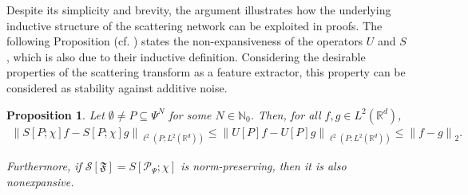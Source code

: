\documentclass[11pt]{amsart}
\newcommand{\R}{{\mathbb{R}}}
\newcommand{\N}{\mathbb{N}}
\newcommand{\s}{\mathcal{S}}
\newcommand{\norm}[1]{\ensuremath{\left\lVert\text{}#1\text{}\right\rVert}}
\newtheorem{proposition}[theorem]{Proposition}
\newenvironment{proof sketch} {\textit{Proof sketch.}}{}
\begin{document}
  Despite its simplicity and brevity, the argument illustrates how the underlying inductive structure of the scattering network can be exploited in proofs. The following Proposition (cf. \cite[Proposition 2.5]{mallat2012group}) states the non-expansiveness of the operators $U$ and $S$, which is also due to their inductive definition. Considering the desirable properties of the scattering transform as a feature extractor, this property can be considered as stability against additive noise.
  
  \begin{proposition}\label{prop: U, S nonexpansive}
    Let $\emptyset \neq P \subseteq \Psi^N$ for some $N \in \N_0$. Then, for all $f,g \in L^2(\R^d)$,
    \begin{align*}
      \norm{S[P;\chi]f-S[P;\chi]g}_{\ell^2(P;L^2(\R^d))} \leq \norm{U[P]f-U[P]g}_{\ell^2(P;L^2(\R^d))}\leq \norm{f-g}_2.
    \end{align*}
  
    Furthermore, if $\s[\mathfrak{F}]=S[\mathcal{P}_\Psi;\chi]$ is norm-preserving, then it is also nonexpansive.
  \end{proposition}
  
\end{document}
